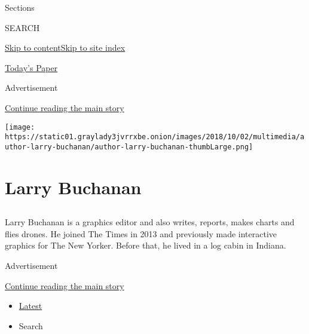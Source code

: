 Sections

SEARCH

\protect\hyperlink{site-content}{Skip to
content}\protect\hyperlink{site-index}{Skip to site index}

\href{https://myaccount.nytimes3xbfgragh.onion/auth/login?response_type=cookie\&client_id=vi}{}

\href{https://www.nytimes3xbfgragh.onion/section/todayspaper}{Today's
Paper}

Advertisement

\protect\hyperlink{after-top}{Continue reading the main story}

\texttt{[image: https://static01.graylady3jvrrxbe.onion/images/2018/10/02/multimedia/author-larry-buchanan/author-larry-buchanan-thumbLarge.png]}

\hypertarget{larry-buchanan}{%
\section{Larry Buchanan}\label{larry-buchanan}}

\subsection{}

Larry Buchanan is a graphics editor and also writes, reports, makes
charts and flies drones. He joined The Times in 2013 and previously made
interactive graphics for The New Yorker. Before that, he lived in a log
cabin in Indiana.

Advertisement

\protect\hyperlink{after-mid1}{Continue reading the main story}

\begin{itemize}
\tightlist
\item
  \protect\hyperlink{stream-panel}{Latest}
\item
  Search
\end{itemize}

